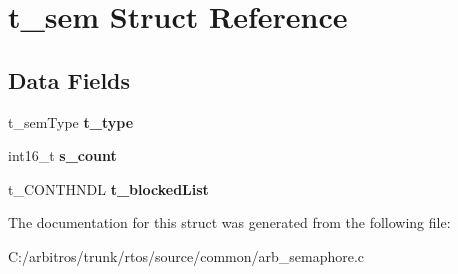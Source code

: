 \hypertarget{structt__sem}{\section{t\-\_\-sem Struct Reference}
\label{structt__sem}
}
\subsection*{Data Fields}
\begin{DoxyCompactItemize}
\item 
\hypertarget{structt__sem_afdb9f7503831da2e51005c49f0b8c910}{t\-\_\-sem\-Type {\bfseries t\-\_\-type}}\label{structt__sem_afdb9f7503831da2e51005c49f0b8c910}

\item 
\hypertarget{structt__sem_a2d1963001c812b33c64e676d5243a950}{int16\-\_\-t {\bfseries s\-\_\-count}}\label{structt__sem_a2d1963001c812b33c64e676d5243a950}

\item 
\hypertarget{structt__sem_a30804ee5540fe0ce5dd59f9d22c2144b}{t\-\_\-\-C\-O\-N\-T\-H\-N\-D\-L {\bfseries t\-\_\-blocked\-List}}\label{structt__sem_a30804ee5540fe0ce5dd59f9d22c2144b}

\end{DoxyCompactItemize}


The documentation for this struct was generated from the following file\-:\begin{DoxyCompactItemize}
\item 
C\-:/arbitros/trunk/rtos/source/common/arb\-\_\-semaphore.\-c\end{DoxyCompactItemize}
